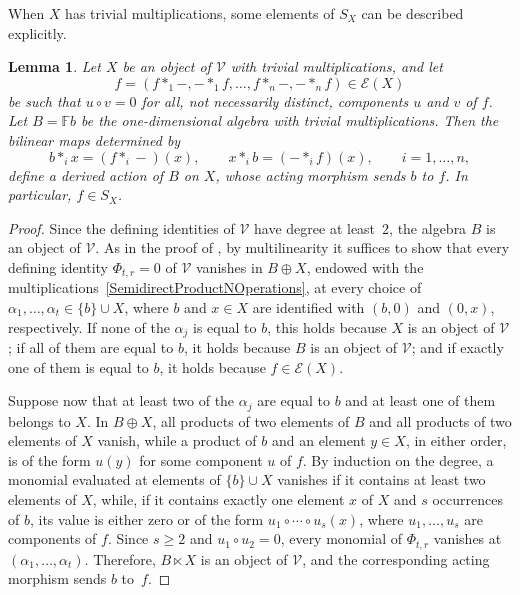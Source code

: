 \documentclass[reqno,a4paper]{amsart}
\theoremstyle{plain}
\newtheorem{lemma}[subsection]{Lemma}
\theoremstyle{definition}
\theoremstyle{remark}
\numberwithin{equation}{section}
\newcommand{\F}{\mathbb{F}}
\newcommand{\E}{\mathcal{E}}
\newcommand{\V}{\mathcal{V}}
\begin{document}
When $X$ has trivial multiplications, some elements of $S_X$ can be described explicitly.

\begin{lemma}\label{LemSquareZero}
Let $X$ be an object of $\V$ with trivial multiplications, and let
\[
f=(f\ast_1-,-\ast_1f,\ldots,f\ast_n-,-\ast_nf)\in\E(X)
\]
be such that $u\circ v=0$ for all, not necessarily distinct, components $u$ and $v$ of $f$. Let $B=\F b$ be the one-dimensional algebra with trivial multiplications. Then the bilinear maps determined by
\[
b\ast_ix=(f\ast_i-)(x),
\qquad
x\ast_ib=(-\ast_if)(x),
\qquad
i=1,\ldots,n,
\]
define a derived action of $B$ on $X$, whose acting morphism sends $b$ to $f$. In particular, $f\in S_X$.
\end{lemma}

\begin{proof}
Since the defining identities of $\V$ have degree at least~$2$, the algebra $B$ is an object of $\V$. As in the proof of , by multilinearity it suffices to show that every defining identity $\Phi_{t,r}=0$ of $\V$ vanishes in $B\oplus X$, endowed with the multiplications~\eqref{SemidirectProductNOperations}, at every choice of $\alpha_1,\ldots,\alpha_t\in\{b\}\cup X$, where $b$ and $x\in X$ are identified with $(b,0)$ and $(0,x)$, respectively. If none of the $\alpha_j$ is equal to $b$, this holds because $X$ is an object of $\V$; if all of them are equal to $b$, it holds because $B$ is an object of $\V$; and if exactly one of them is equal to $b$, it holds because $f\in\E(X)$.

Suppose now that at least two of the $\alpha_j$ are equal to $b$ and at least one of them belongs to $X$. In $B\oplus X$, all products of two elements of $B$ and all products of two elements of $X$ vanish, while a product of $b$ and an element $y\in X$, in either order, is of the form $u(y)$ for some component $u$ of $f$. By induction on the degree, a monomial evaluated at elements of $\{b\}\cup X$ vanishes if it contains at least two elements of $X$, while, if it contains exactly one element $x$ of $X$ and $s$ occurrences of $b$, its value is either zero or of the form $u_1\circ\cdots\circ u_s(x)$, where $u_1,\ldots,u_s$ are components of $f$. Since $s\geq2$ and $u_1\circ u_2=0$, every monomial of $\Phi_{t,r}$ vanishes at $(\alpha_1,\ldots,\alpha_t)$. Therefore, $B\ltimes X$ is an object of $\V$, and the corresponding acting morphism sends $b$ to~$f$.
\end{proof}
\end{document}
